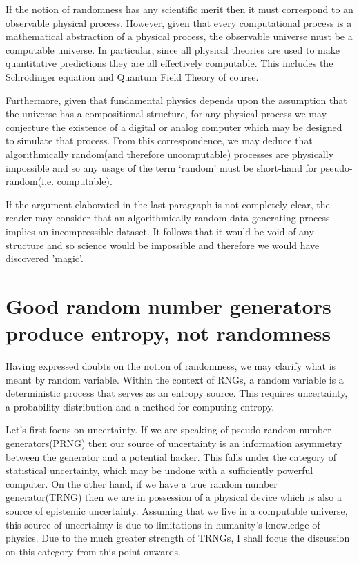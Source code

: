 \documentclass{article}
\begin{document}
If the notion of randomness has any scientific merit then it must correspond to an observable physical process. However, given that every computational process is a mathematical abstraction of a physical process,  the observable universe must be a computable universe. In particular, since all physical theories are used to make quantitative predictions they are all effectively computable. This includes the Schrödinger equation and Quantum Field Theory of course.

Furthermore, given that fundamental physics depends upon the assumption that the universe has a compositional structure, for any physical process we may conjecture the existence of a digital or analog computer which may be designed to simulate that process. From this correspondence, we may deduce that algorithmically random(and therefore uncomputable) processes are physically impossible and so any usage of the term ‘random’ must be short-hand for pseudo-random(i.e. computable).

If the argument elaborated in the last paragraph is not completely clear, the reader may consider that an algorithmically random data generating process implies an incompressible dataset. It follows that it would be void of any structure and so science would be impossible and therefore we would have discovered 'magic'.  
\newpage

\section{Good random number generators produce entropy, not randomness}

Having expressed doubts on the notion of randomness, we may clarify what is meant by random variable. Within the context of RNGs, a random variable is a deterministic process that serves as an entropy source. This requires uncertainty, a probability distribution and a method for computing entropy.

Let's first focus on uncertainty. If we are speaking of pseudo-random number generators(PRNG) then our source of uncertainty is an information asymmetry between the generator and a potential hacker. This falls under the category of statistical uncertainty, which may be undone with a sufficiently powerful computer. On the other hand, if we have a true random number generator(TRNG) then we are in possession of a physical device which is also a source of epistemic uncertainty. Assuming that we live in a computable universe, this source of uncertainty is due to limitations in humanity's knowledge of physics. Due to the much greater strength of TRNGs, I shall focus the discussion on this category from this point onwards. 
\end{document}
